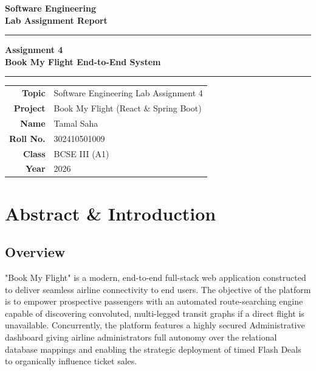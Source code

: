 \documentclass[12pt,a4paper]{article}
\begin{document}
\begin{titlepage}
    \centering
    \vspace*{2cm}

    {\Huge\bfseries\color{titleblue} Software Engineering\\[0.4em]
    \large Lab Assignment Report}

    \vspace{1.5cm}
    \rule{\linewidth}{1pt}

    \vspace{0.8cm}
    {\LARGE\bfseries Assignment 4\\[0.3em]
    \large Book My Flight End-to-End System}

    \vspace{0.8cm}
    \rule{\linewidth}{1pt}

    \vfill

    \begin{tabular}{rl}
        \textbf{Topic}      & Software Engineering Lab Assignment 4 \\[6pt]
        \textbf{Project}    & Book My Flight (React \& Spring Boot) \\[6pt]
        \textbf{Name}       & Tamal Saha \\[6pt]
        \textbf{Roll No.}   & 302410501009 \\[6pt]
        \textbf{Class}      & BCSE III (A1) \\[6pt]
        \textbf{Year}       & 2026 \\[6pt]
    \end{tabular}

    \vspace{2cm}
\end{titlepage}

\newpage
\tableofcontents
\newpage

\section{Abstract \& Introduction}
\subsection{Overview}
"Book My Flight" is a modern, end-to-end full-stack web application constructed to deliver seamless airline connectivity to end users. The objective of the platform is to empower prospective passengers with an automated route-searching engine capable of discovering convoluted, multi-legged transit graphs if a direct flight is unavailable. Concurrently, the platform features a highly secured Administrative dashboard giving airline administrators full autonomy over the relational database mappings and enabling the strategic deployment of timed Flash Deals to organically influence ticket sales.
\end{document}
